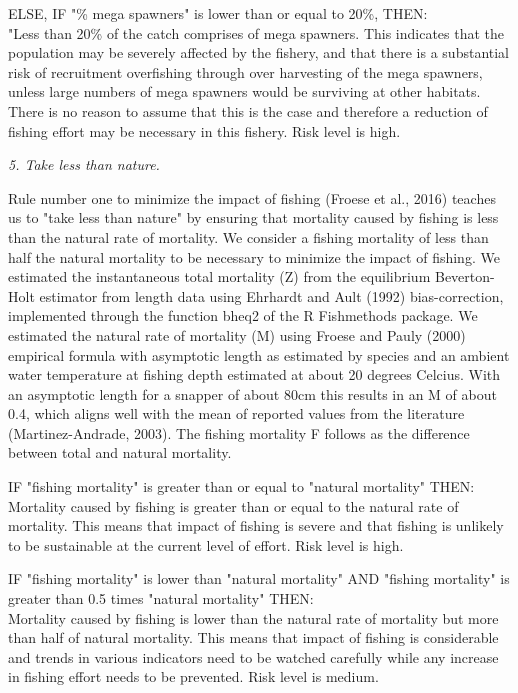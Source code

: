 ELSE, IF "\% mega spawners" is lower than or equal to 20\%, THEN:\\[0cm]
"Less than 20\% of the catch comprises of mega spawners.  This indicates that the population may be severely affected by the fishery, and that there is a substantial risk of recruitment overfishing through over harvesting of the mega spawners, unless large numbers of mega spawners would be surviving at other habitats. There is no reason to assume that this is the case and therefore a reduction of fishing effort may be necessary in this fishery. Risk level is high.

\clearpage
\newpage

\textit{5. Take less than nature.}

Rule number one to minimize the impact of fishing (Froese et al., 2016) teaches us to "take less than nature" by ensuring that mortality caused by fishing is less than the natural rate of mortality. We consider a fishing mortality of less than half the natural mortality to be necessary to minimize the impact of fishing. We estimated the instantaneous total mortality (Z) from the equilibrium Beverton-Holt estimator from length data using Ehrhardt and Ault (1992) bias-correction, implemented through the function bheq2 of the R Fishmethods package. We estimated the natural rate of mortality (M) using Froese and Pauly (2000) empirical formula with asymptotic length as estimated by species and an ambient water temperature at fishing depth estimated at about 20 degrees Celcius. With an asymptotic length for a snapper of about 80cm this results in an M of about 0.4, which aligns well with the mean of reported values from the literature (Martinez-Andrade, 2003). The fishing mortality F follows as the difference between total and natural mortality.

IF "fishing mortality" is greater than or equal to "natural mortality" THEN:\\[0cm]
Mortality caused by fishing is greater than or equal to the natural rate of mortality. This means that impact of fishing is severe and that fishing is unlikely to be sustainable at the current level of effort. Risk level is high.

IF "fishing mortality" is lower than "natural mortality" AND "fishing mortality" is greater than 0.5 times "natural mortality" THEN:\\[0cm]
Mortality caused by fishing is lower than the natural rate of mortality but more than half of natural mortality. This means that impact of fishing is considerable and trends in various indicators need to be watched carefully while any increase in fishing effort needs to be prevented. Risk level is medium.

